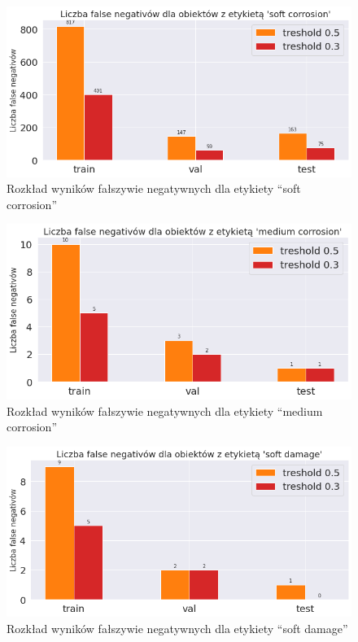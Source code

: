 \documentclass[polish,12pt]{aghthesis}
\begin{document}
\begin{figure}[h!]
    \centering
    \includegraphics[width=13cm]{images/fp_count_soft_corrosion.png}
    \caption{Rozkład wyników fałszywie negatywnych dla etykiety ``soft corrosion''}
\end{figure}

\begin{figure}[h!]
    \centering
    \includegraphics[width=13cm]{images/fp_count_medium_corrosion.png}
    \caption{Rozkład wyników fałszywie negatywnych dla etykiety ``medium corrosion''}
\end{figure}

\begin{figure}[h!]
    \centering
    \includegraphics[width=13cm]{images/fp_count_soft_damage.png}
    \caption{Rozkład wyników fałszywie negatywnych dla etykiety ``soft damage''}
\end{figure}
\end{document}

